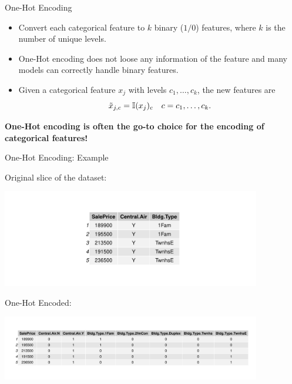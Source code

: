\documentclass[11pt,compress,t,notes=noshow, xcolor=table]{beamer}
\begin{document}
\begin{vbframe}{One-Hot Encoding}

\begin{itemize}
\item Convert each categorical feature to $k$ binary ($1/0$) features, where $k$ is the number of unique levels.

\item One-Hot encoding does not loose any information of the feature and many models can correctly handle binary features.

\item Given a categorical feature $x_j$ with levels $c_1,\dots, c_k$, the new features are
$$\tilde x_{j,c} = \mathbb{I}(x_j)_{c} \quad c = c_1,\dots,c_k.$$
\end{itemize}

\textbf{One-Hot encoding is often the go-to choice for the encoding of categorical features!}

\end{vbframe}

\begin{vbframe}{One-Hot Encoding: Example}

Original slice of the dataset:


\begin{center}
\includegraphics[width = 0.85\textwidth]{figure/categorical_original_table.pdf}
\end{center}


One-Hot Encoded:

\begin{center}
\includegraphics[width = 0.85\textwidth]{figure/categorical_onehot_table.pdf}
\end{center}


\end{vbframe}
\end{document}
